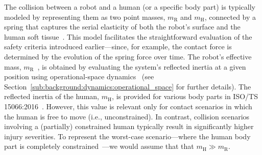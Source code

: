 The collision between a robot and a human (or a specific body part) is typically modeled by representing them as two point masses, $m_\mathrm{R}$ and $m_\mathrm{H}$, connected by a spring that captures the serial elasticity of both the robot’s surface and the human soft tissue~\citep{bicchi2004fast, haddadin2009requirements, iso2016collaborative}. This model facilitates the straightforward evaluation of the safety criteria introduced earlier—since, for example, the contact force is determined by the evolution of the spring force over time. The robot’s effective mass, $m_\mathrm{R}$~\citep{kirschner2021notion}, is obtained by evaluating the system’s reflected inertia at a given position using operational-space dynamics~\citep{khatib1987unified} (see Section~\ref{sub:background:dynamics:operational_space} for further details). The reflected inertia of the human, $m_\mathrm{H}$, is provided for various body parts in ISO/TS 15066:2016~\citep{iso2016collaborative}. However, this value is relevant only for contact scenarios in which the human is free to move (i.e., unconstrained). In contrast, collision scenarios involving a (partially) constrained human typically result in significantly higher injury severities. To represent the worst-case scenario—where the human body part is completely constrained~\citep{haddadin2009requirements, haddadin2011safe}—we would assume that that $m_\mathrm{H} \gg m_\mathrm{R}$.


